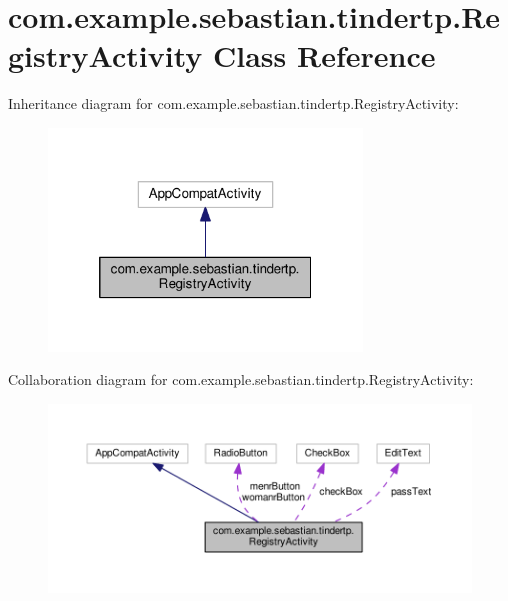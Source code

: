 \hypertarget{classcom_1_1example_1_1sebastian_1_1tindertp_1_1RegistryActivity}{}\section{com.\+example.\+sebastian.\+tindertp.\+Registry\+Activity Class Reference}
\label{classcom_1_1example_1_1sebastian_1_1tindertp_1_1RegistryActivity}


Inheritance diagram for com.\+example.\+sebastian.\+tindertp.\+Registry\+Activity\+:\nopagebreak
\begin{figure}[H]
\begin{center}
\leavevmode
\includegraphics[width=236pt]{classcom_1_1example_1_1sebastian_1_1tindertp_1_1RegistryActivity__inherit__graph}
\end{center}
\end{figure}


Collaboration diagram for com.\+example.\+sebastian.\+tindertp.\+Registry\+Activity\+:\nopagebreak
\begin{figure}[H]
\begin{center}
\leavevmode
\includegraphics[width=350pt]{classcom_1_1example_1_1sebastian_1_1tindertp_1_1RegistryActivity__coll__graph}
\end{center}
\end{figure}
